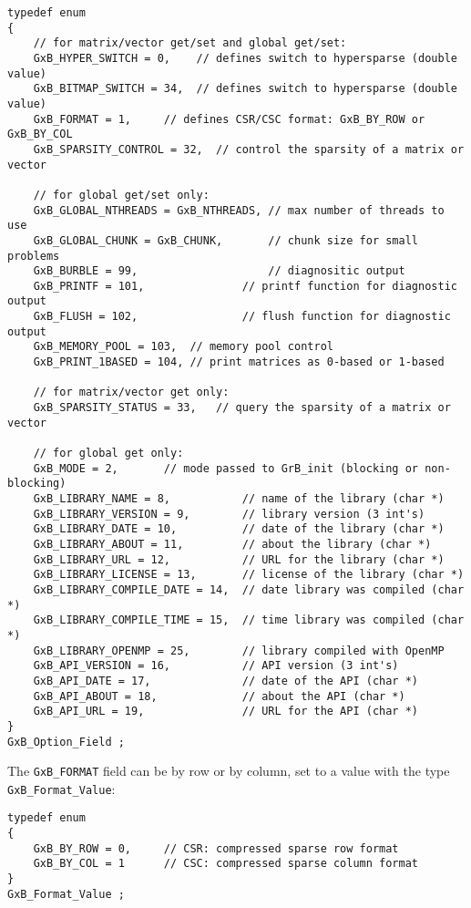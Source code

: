 \documentclass[12pt]{article}
\begin{document}
{\footnotesize
\begin{verbatim}
typedef enum
{
    // for matrix/vector get/set and global get/set:
    GxB_HYPER_SWITCH = 0,    // defines switch to hypersparse (double value)
    GxB_BITMAP_SWITCH = 34,  // defines switch to hypersparse (double value)
    GxB_FORMAT = 1,     // defines CSR/CSC format: GxB_BY_ROW or GxB_BY_COL
    GxB_SPARSITY_CONTROL = 32,  // control the sparsity of a matrix or vector

    // for global get/set only:
    GxB_GLOBAL_NTHREADS = GxB_NTHREADS, // max number of threads to use
    GxB_GLOBAL_CHUNK = GxB_CHUNK,       // chunk size for small problems
    GxB_BURBLE = 99,                    // diagnositic output
    GxB_PRINTF = 101,               // printf function for diagnostic output
    GxB_FLUSH = 102,                // flush function for diagnostic output
    GxB_MEMORY_POOL = 103,  // memory pool control
    GxB_PRINT_1BASED = 104, // print matrices as 0-based or 1-based

    // for matrix/vector get only:
    GxB_SPARSITY_STATUS = 33,   // query the sparsity of a matrix or vector

    // for global get only:
    GxB_MODE = 2,       // mode passed to GrB_init (blocking or non-blocking)
    GxB_LIBRARY_NAME = 8,           // name of the library (char *)
    GxB_LIBRARY_VERSION = 9,        // library version (3 int's)
    GxB_LIBRARY_DATE = 10,          // date of the library (char *)
    GxB_LIBRARY_ABOUT = 11,         // about the library (char *)
    GxB_LIBRARY_URL = 12,           // URL for the library (char *)
    GxB_LIBRARY_LICENSE = 13,       // license of the library (char *)
    GxB_LIBRARY_COMPILE_DATE = 14,  // date library was compiled (char *)
    GxB_LIBRARY_COMPILE_TIME = 15,  // time library was compiled (char *)
    GxB_LIBRARY_OPENMP = 25,        // library compiled with OpenMP
    GxB_API_VERSION = 16,           // API version (3 int's)
    GxB_API_DATE = 17,              // date of the API (char *)
    GxB_API_ABOUT = 18,             // about the API (char *)
    GxB_API_URL = 19,               // URL for the API (char *)
}
GxB_Option_Field ;
\end{verbatim} }

The \verb'GxB_FORMAT' field can be by row or by column, set to a value
with the type \verb'GxB_Format_Value':

{\footnotesize
\begin{verbatim}
typedef enum
{
    GxB_BY_ROW = 0,     // CSR: compressed sparse row format
    GxB_BY_COL = 1      // CSC: compressed sparse column format
}
GxB_Format_Value ;
\end{verbatim} }
\end{document}
